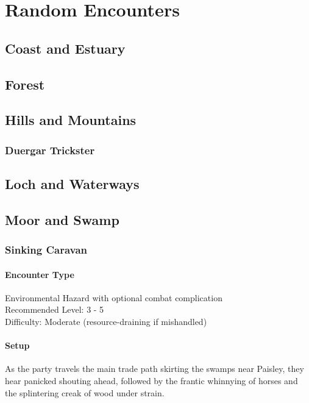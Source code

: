 \chapter*{Random Encounters}

\section*{Coast and Estuary}

\section*{Forest}

\section*{Hills and Mountains}
\subsection*{Duergar Trickster}

\section*{Loch and Waterways}

\section*{Moor and Swamp}
\subsection*{Sinking Caravan}
\subsubsection*{Encounter Type}
Environmental Hazard with optional combat complication\\
Recommended Level: 3 - 5\\
Difficulty: Moderate (resource-draining if mishandled)
\subsubsection*{Setup}
As the party travels the main trade path skirting the swamps near Paisley, they hear panicked shouting ahead, followed by the frantic whinnying of horses and the splintering creak of wood under strain.

